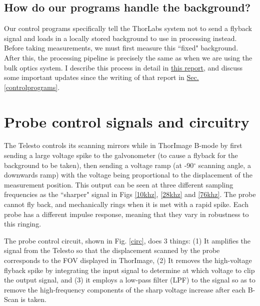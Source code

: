 \documentclass{article}
\begin{document}
\subsection{How do our programs handle the background?}

\par{Our control programs specifically tell the ThorLabs system not to send a flyback signal and loads in a locally stored background to use in processing instead. Before taking measurements, we must first measure this ``fixed" background. After this, the processing pipeline is precisely the same as when we are using the bulk optics system. I describe this process in detail in \href{https://github.com/Brian-Frost-LaPlante/LabReports/blob/main/ProbeReports/Fixed-BackgroundProcessing.pdf}{this report}, and discuss some important updates since the writing of that report in \hyperlink{controlprograms}{Sec. \ref{controlprograms}}.}

\section{Probe control signals and circuitry}\label{circsection}
\hypertarget{circsection}{}

\par{The Telesto controls its scanning mirrors while in ThorImage B-mode by first sending a large voltage spike to the galvonometer (to cause a flyback for the background to be taken), then sending a voltage ramp (at -90$^{\circ}$ scanning angle, a downwards ramp) with the voltage being proportional to the displacement of the measurement position. This output can be seen at three different sampling frequencies as the ``sharper" signal in Figs \ref{10khz}, \ref{28khz} and \ref{76khz}. The probe cannot fly back, and mechanically rings when it is met with a rapid spike. Each probe has a different impulse response, meaning that they vary in robustness to this ringing.}

\par{The probe control circuit, shown in Fig. \ref{circ}, does 3 things: (1) It amplifies the signal from the Telesto so that the displacement scanned by the probe corresponds to the FOV displayed in ThorImage, (2) It removes the high-voltage flyback spike by integrating the input signal to determine at which voltage to clip the output signal, and (3) it employs a low-pass filter (LPF) to the signal so as to remove the high-frequency components of the sharp voltage increase after each B-Scan is taken.}
\end{document}
